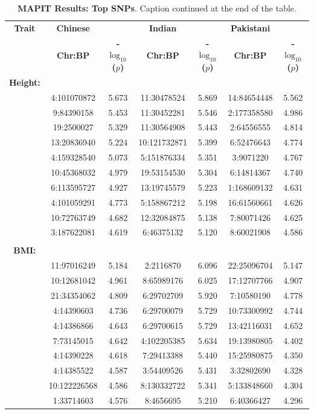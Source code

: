 \documentclass[12pt, a4paper]{article}
\begin{document}
\begin{landscape}
\setlength{\footskip}{2cm}
\begin{table}[ht]
\centering
\begin{tabular}{ccccccc}
  \hline
  \textbf{Trait} & \textbf{Chinese} & & \textbf{Indian} & & \textbf{Pakistani} & \\ 
& \textbf{Chr:BP} & \textbf{-$\log_{10}$($p$)} & \textbf{Chr:BP} & \textbf{-$\log_{10}$($p$)} & \textbf{Chr:BP} & \textbf{-$\log_{10}$($p$)} \\ 
  \hline
\textbf{Height:} & & & & & & \\
& 4:101070872 & 5.673 & 11:30478524 & 5.869 & 14:84654448 & 5.562 \\ 
  & 9:84390158 & 5.453 & 11:30452281 & 5.546 & 2:177358580 & 4.986 \\ 
  & 19:2500027 & 5.329 & 11:30564908 & 5.443 & 2:64556555 & 4.814 \\ 
  & 13:20836940 & 5.224 & 10:121732871 & 5.399 & 6:52476643 & 4.774 \\ 
  & 4:159328540 & 5.073 & 5:151876334 & 5.351 & 3:9071220 & 4.767 \\ 
  & 10:45368032 & 4.979 & 19:53154530 & 5.304 & 6:14814367 & 4.740 \\ 
  & 6:113595727 & 4.927 & 13:19745579 & 5.223 & 1:168609132 & 4.631 \\ 
  & 4:101059291 & 4.773 & 5:158867212 & 5.198 & 16:61560661 & 4.626 \\ 
  & 10:72763749 & 4.682 & 12:32084875 & 5.138 & 7:80071426 & 4.625 \\ 
  & 3:187622081 & 4.619 & 6:46375132 & 5.120 & 8:60021908 & 4.586 \\ 
   \\
\textbf{BMI:} & & & & & & \\
& 11:97016249 & 5.184 & 2:2116870 & 6.096 & 22:25096704 & 5.147 \\ 
  & 10:12681042 & 4.961 & 8:65989176 & 6.025 & 17:12707766 & 4.907 \\ 
  & 21:34354062 & 4.809 & 6:29702709 & 5.920 & 7:10580190 & 4.778 \\ 
  & 4:14390603 & 4.736 & 6:29700079 & 5.729 & 10:73300992 & 4.744 \\ 
  & 4:14386866 & 4.643 & 6:29700615 & 5.729 & 13:42116031 & 4.652 \\ 
  & 7:73145015 & 4.642 & 4:102205385 & 5.634 & 19:13980805 & 4.402 \\ 
  & 4:14390228 & 4.618 & 7:29413388 & 5.440 & 15:25980875 & 4.350 \\ 
  & 4:14385522 & 4.587 & 3:54409526 & 5.431 & 3:32802690 & 4.328 \\ 
  & 10:122226568 & 4.586 & 8:130332722 & 5.341 & 5:133848660 & 4.304 \\ 
  & 1:33714603 & 4.576 & 8:4656695 & 5.210 & 6:40366427 & 4.296 \\ 
   \hline
\end{tabular}
\caption[TBD]{\textbf{MAPIT Results: Top SNPs}. Caption continued at the end of the table.}
\label{InterPath-Supp-Table-MAPIT-TopSNPs-b}
\end{table}
\end{landscape}
\clearpage
\setlength{\footskip}{1cm}
\addtocounter{table}{-1}
\end{document}
